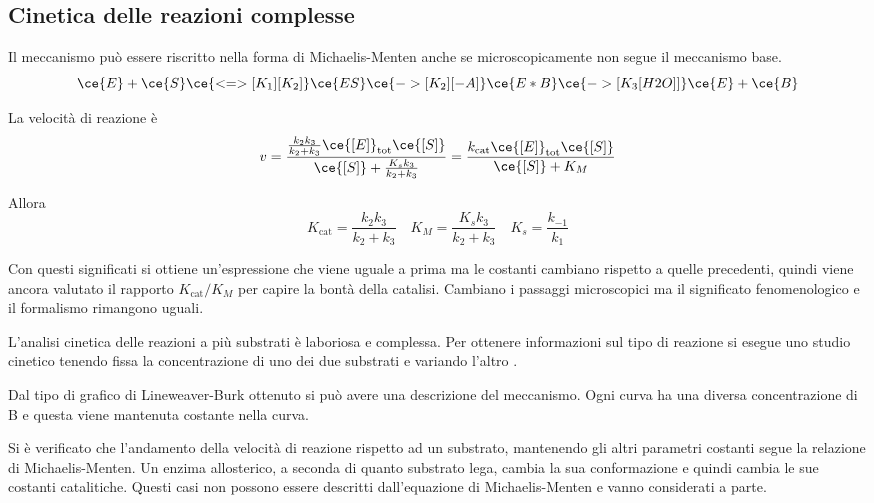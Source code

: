 \subsection{Cinetica delle reazioni complesse}

Il meccanismo può essere riscritto nella forma di Michaelis-Menten anche se microscopicamente non segue il meccanismo base.
\[
\ce{E} + \ce{S} \ce{<=>[K_1][K_2]} \ce{ES} \ce{->[K_2][-A]} \ce{E*B} \ce{->[K_3 [H2O]]} \ce{E} + \ce{B}
\]

La velocità di reazione è
\[
v = \frac{\frac{k_2 k_3}{k_2 + k_3} \ce{[E]}_{\text{tot}} \ce{[S]}}{\ce{[S]} + \frac{K_s k_3}{k_2 + k_3}} = \frac{k_{\text{cat}} \ce{[E]}_{\text{tot}} \ce{[S]}}{\ce{[S]} + K_M}
\]

Allora
\[
K_{\text{cat}} = \frac{k_2 k_3}{k_2 + k_3} \quad K_M = \frac{K_s k_3}{k_2 + k_3} \quad K_s = \frac{k_{-1}}{k_1} 
\]

Con questi significati si ottiene un’espressione che viene uguale a prima ma le
costanti cambiano rispetto a quelle precedenti, quindi viene ancora valutato il
rapporto $K_{\text{cat}}/K_M$ per capire la bontà della catalisi.
Cambiano i passaggi microscopici ma il significato fenomenologico e il formalismo rimangono uguali.

L’analisi cinetica delle reazioni a più substrati è laboriosa e complessa. Per ottenere informazioni sul tipo di reazione si esegue uno studio cinetico tenendo fissa la concentrazione di uno dei due substrati \ce{[B]} e variando l’altro \ce{[A]}.

Dal tipo di grafico di Lineweaver-Burk ottenuto si può avere una descrizione del
meccanismo.
Ogni curva ha una diversa concentrazione di B e questa viene mantenuta
costante nella curva.


Si è verificato che l'andamento della velocità di reazione rispetto ad un substrato, mantenendo gli altri parametri costanti segue la relazione di Michaelis-Menten. Un enzima allosterico, a seconda di quanto substrato lega, cambia la sua conformazione e quindi cambia le sue costanti catalitiche. Questi casi non possono essere descritti dall'equazione di Michaelis-Menten e vanno considerati a parte.

